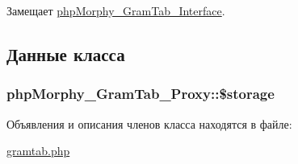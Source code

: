 Замещает \hyperlink{interfacephpMorphy__GramTab__Interface_a4fc163ef8da2bb73ba1d99795619ef40}{phpMorphy\_\-GramTab\_\-Interface}.



\subsection{Данные класса}
\hypertarget{classphpMorphy__GramTab__Proxy_a2e5438c7f1d1e021bb1e6f552a4108bd}{
\subsubsection[{\$storage}]{\setlength{\rightskip}{0pt plus 5cm}phpMorphy\_\-GramTab\_\-Proxy::\$storage}}
\label{classphpMorphy__GramTab__Proxy_a2e5438c7f1d1e021bb1e6f552a4108bd}


Объявления и описания членов класса находятся в файле:\begin{DoxyCompactItemize}
\item 
\hyperlink{gramtab_8php}{gramtab.php}\end{DoxyCompactItemize}
